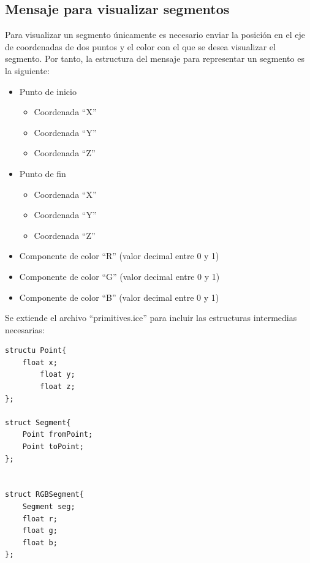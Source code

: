 \subsection{Mensaje para visualizar segmentos}
Para visualizar un segmento únicamente es necesario enviar la posición en el eje de coordenadas de dos puntos y el color con el que se desea visualizar el segmento. Por tanto, la estructura del mensaje para representar un segmento es la siguiente:
\begin{itemize}
\item Punto de inicio
	\begin{itemize}
		\item Coordenada ``X''
		\item Coordenada ``Y''
		\item Coordenada ``Z''
	\end{itemize}
\item Punto de fin
	\begin{itemize}
		\item Coordenada ``X''
		\item Coordenada ``Y''
		\item Coordenada ``Z''
	\end{itemize}
\item Componente de color ``R'' (valor decimal entre 0 y 1)
\item Componente de color ``G'' (valor decimal entre 0 y 1)
\item Componente de color ``B'' (valor decimal entre 0 y 1)
\end{itemize}

Se extiende el archivo ``primitives.ice'' para incluir las estructuras intermedias necesarias:

\begin{lstlisting}[caption= Definición de la estrucutura del segmento con Slice, label=cod.segmentoslice]
structu Point{
	float x;
      	float y;
      	float z;
};

struct Segment{
	Point fromPoint;
	Point toPoint;
};


struct RGBSegment{
	Segment seg;
	float r;
	float g;
	float b;
};

\end{lstlisting}

